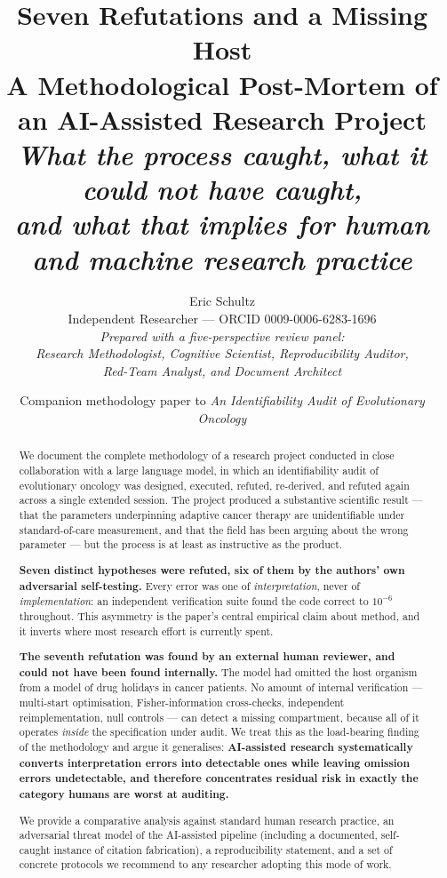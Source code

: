 \documentclass[11pt,a4paper]{article}
\title{\vspace{-1.5em}\textbf{Seven Refutations and a Missing Host}\\[0.4em]
\large A Methodological Post-Mortem of an AI-Assisted Research Project\\
\normalsize\itshape What the process caught, what it could not have caught,\\
\itshape and what that implies for human and machine research practice}
\author{Eric Schultz\\[0.2em]
\small Independent Researcher --- ORCID 0009-0006-6283-1696\\[0.5em]
\small\itshape Prepared with a five-perspective review panel:\\
\small\itshape Research Methodologist, Cognitive Scientist, Reproducibility Auditor,\\
\small\itshape Red-Team Analyst, and Document Architect}
\date{\small Companion methodology paper to \emph{An Identifiability Audit of Evolutionary Oncology}}
\begin{document}
\maketitle
\thispagestyle{fancy}

\begin{abstract}
\noindent
We document the complete methodology of a research project conducted in close
collaboration with a large language model, in which an identifiability audit of
evolutionary oncology was designed, executed, refuted, re-derived, and refuted again
across a single extended session. The project produced a substantive scientific result
--- that the parameters underpinning adaptive cancer therapy are unidentifiable under
standard-of-care measurement, and that the field has been arguing about the wrong
parameter --- but the process is at least as instructive as the product.

\textbf{Seven distinct hypotheses were refuted, six of them by the authors' own
adversarial self-testing.} Every error was one of \emph{interpretation}, never of
\emph{implementation}: an independent verification suite found the code correct to
$10^{-6}$ throughout. This asymmetry is the paper's central empirical claim about
method, and it inverts where most research effort is currently spent.

\textbf{The seventh refutation was found by an external human reviewer, and could not
have been found internally.} The model had omitted the host organism from a model of
drug holidays in cancer patients. No amount of internal verification --- multi-start
optimisation, Fisher-information cross-checks, independent reimplementation, null
controls --- can detect a missing compartment, because all of it operates \emph{inside}
the specification under audit. We treat this as the load-bearing finding of the
methodology and argue it generalises: \textbf{AI-assisted research systematically
converts interpretation errors into detectable ones while leaving omission errors
undetectable, and therefore concentrates residual risk in exactly the category humans
are worst at auditing.}

We provide a comparative analysis against standard human research practice, an
adversarial threat model of the AI-assisted pipeline (including a documented,
self-caught instance of citation fabrication), a reproducibility statement, and a set
of concrete protocols we recommend to any researcher adopting this mode of work.
\end{abstract}

\tableofcontents
\end{document}
